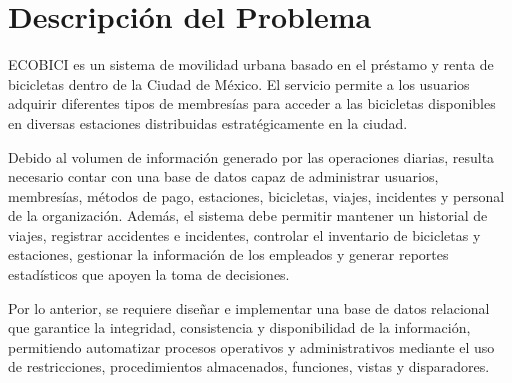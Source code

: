 \section{Descripción del Problema}

ECOBICI es un sistema de movilidad urbana basado en el préstamo y renta de bicicletas dentro de la Ciudad de México. El servicio permite a los usuarios adquirir diferentes tipos de membresías para acceder a las bicicletas disponibles en diversas estaciones distribuidas estratégicamente en la ciudad.

Debido al volumen de información generado por las operaciones diarias, resulta necesario contar con una base de datos capaz de administrar usuarios, membresías, métodos de pago, estaciones, bicicletas, viajes, incidentes y personal de la organización. Además, el sistema debe permitir mantener un historial de viajes, registrar accidentes e incidentes, controlar el inventario de bicicletas y estaciones, gestionar la información de los empleados y generar reportes estadísticos que apoyen la toma de decisiones.

Por lo anterior, se requiere diseñar e implementar una base de datos relacional que garantice la integridad, consistencia y disponibilidad de la información, permitiendo automatizar procesos operativos y administrativos mediante el uso de restricciones, procedimientos almacenados, funciones, vistas y disparadores.
